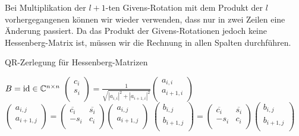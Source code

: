 \documentclass{article}
\theoremstyle{plain}
\begin{document}
Bei Multiplikation der $l+1$-ten Givens-Rotation mit dem Produkt der $l$ vorhergegangenen können wir wieder verwenden, dass nur in zwei Zeilen eine Änderung passiert. Da das Produkt der Givens-Rotationen jedoch keine Hessenberg-Matrix ist, müssen wir die Rechnung in allen Spalten durchführen.


\begin{algorithm}
	\label{QR-Zerlegung_Hessenberg}
	\caption{QR-Zerlegung für Hessenberg-Matrizen}
	\begin{algorithmic}[1]
		\State $B = \operatorname{id} \in \mathbb{C}^{n\times n}$
		\State $\left(\begin{array}{c}
    c_i \\
    s_i \\
\end{array}\right)
=
\frac{1}{\sqrt{|a_{i,i}|^2 + |a_{i+1,i}|^2}}
\left(\begin{array}{c}
a_{i,i} \\
a_{i+1,i} \\
\end{array}\right)$
		\State $\left(\begin{array}{c}
		a_{i,j} \\
		a_{i+1,j}\\
		\end{array}\right)
		=
		\left(\begin{array}{cc}
		\overline{c_i} & \overline{s_i} \\
		-s_i & c_i \\
		\end{array}
		\right)
		\left(\begin{array}{c}
		a_{i,j} \\
		a_{i+1,j}\\
		\end{array}\right)$
		\EndFor
		\State $\left(\begin{array}{c}
		b_{i,j} \\
		b_{i+1,j}\\
		\end{array}\right)
		=
		\left(\begin{array}{cc}
		\overline{c_i} & \overline{s_i} \\
		-s_i & c_i \\
		\end{array}
		\right)
		\left(\begin{array}{c}
		b_{i,j} \\
		b_{i+1,j}\\
		\end{array}\right)$
		\EndFor
		\EndFor
	\end{algorithmic}
\end{algorithm}
\end{document}
